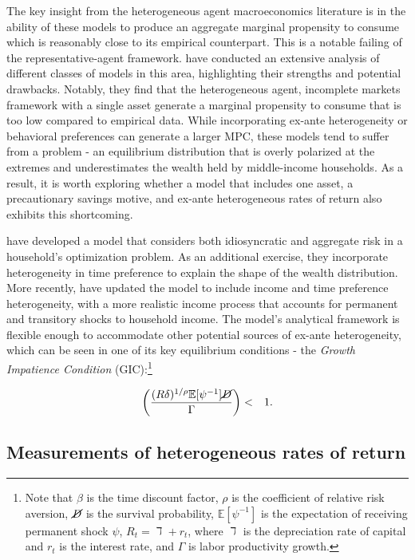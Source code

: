 \par The key insight from the heterogeneous agent macroeconomics literature is in the ability of these models to produce an aggregate marginal propensity to consume which is reasonably close to its empirical counterpart. This is a notable failing of the representative-agent framework. \cite{gkgv22} have conducted an extensive analysis of different classes of models in this area, highlighting their strengths and potential drawbacks. Notably, they find that the heterogeneous agent, incomplete markets framework with a single asset generate a marginal propensity to consume that is too low compared to empirical data. While incorporating ex-ante heterogeneity or behavioral preferences can generate a larger MPC, these models tend to suffer from a  problem - an equilibrium distribution that is overly polarized at the extremes and underestimates the wealth held by middle-income households. As a result, it is worth exploring whether a model that includes one asset, a precautionary savings motive, and ex-ante heterogeneous rates of return also exhibits this shortcoming.

\par  \cite{ks1998} have developed a model that considers both idiosyncratic and aggregate risk in a household's optimization problem. As an additional exercise, they incorporate heterogeneity in time preference to explain the shape of the wealth distribution. More recently, \cite{cstw2017} have updated the model to include income and time preference heterogeneity, with a more realistic income process that accounts for permanent and transitory shocks to household income. The model's analytical framework is flexible enough to accommodate other potential sources of ex-ante heterogeneity, which can be seen in one of its key equilibrium conditions - the \textit{Growth Impatience Condition} (GIC):\footnote{Note that $\beta$ is the time discount factor, $\rho$ is the coefficient of relative risk aversion, $\cancel{D}$ is the survival probability, $\mathbb{E}[\psi^{-1}]$ is the expectation of receiving permanent shock $\psi$, $R_t = \daleth + r_t$, where $\daleth$ is the depreciation rate of capital and $r_t$ is the interest rate, and $\Gamma$ is labor productivity growth.}

\begin{eqnarray*}
\left(\frac{(R \delta)^{1/\rho}\mathbb{E}[\psi^{-1}]\cancel{D}}{\Gamma}\right) & < & 1.
\end{eqnarray*}

\subsection{Measurements of heterogeneous rates of return}

